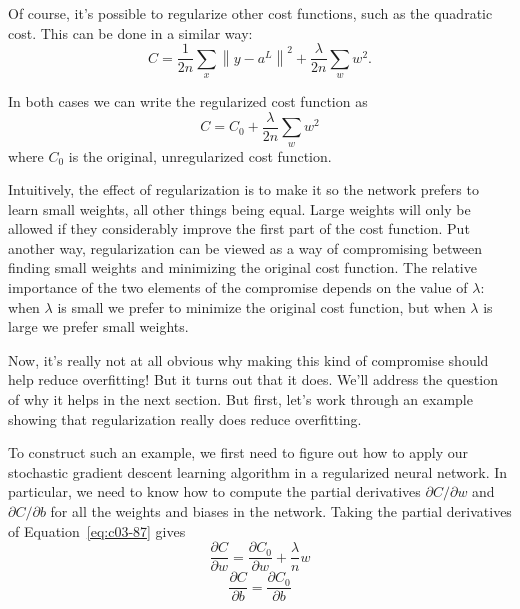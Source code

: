 Of course, it's possible to regularize other cost functions, such as the quadratic cost. This can be done in a similar way:
\begin{equation}
C=\frac{1}{2 n} \sum_{x}\left\|y-a^{L}\right\|^{2}+\frac{\lambda}{2 n} \sum_{w} w^{2}.
\label{eq:c03-86} 
\end{equation}

In both cases we can write the regularized cost function as 
\begin{equation}
C=C_{0}+\frac{\lambda}{2 n} \sum_{w} w^{2}
\label{eq:c03-87} 
\end{equation}
where $C_{0}$ is the original, unregularized cost function.


Intuitively, the effect of regularization is to make it so the network prefers to learn small weights, all other things being equal. Large weights will only be allowed if they considerably improve the first part of the cost function. Put another way, regularization can be viewed as a way of compromising between finding small weights and minimizing the original cost function. The relative importance of the two elements of the compromise depends on the value of $\lambda$: when $\lambda$ is small we prefer to minimize the original cost function, but when $\lambda$ is large we prefer small weights.

Now, it's really not at all obvious why making this kind of compromise should help reduce overfitting! But it turns out that it does. We'll address the question of why it helps in the next section. But first, let's work through an example showing that regularization really does reduce overfitting.

To construct such an example, we first need to figure out how to apply our stochastic gradient descent learning algorithm in a regularized neural network. In particular, we need to know how to compute the partial derivatives 
$\partial C / \partial w$ and $\partial C / \partial b$
for all the weights and biases in the network. Taking the partial derivatives of Equation~\ref{eq:c03-87}  gives
\begin{equation}
\frac{\partial C}{\partial w} =\frac{\partial C_{0}}{\partial w}+\frac{\lambda}{n} w 
\label{eq:c03-88} 
\end{equation}
\begin{equation}
\frac{\partial C}{\partial b} =\frac{\partial C_{0}}{\partial b} 
\label{eq:c03-89} 
\end{equation}

